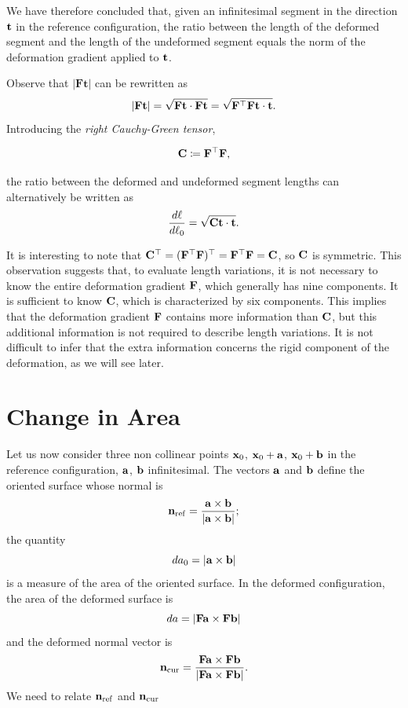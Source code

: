 We have therefore concluded that, given an infinitesimal segment in the direction $\mathbf{t}$ in the reference configuration, the ratio between the length of the deformed segment and the length of the undeformed segment equals the norm of the deformation gradient applied to $\mathbf{t}$.  

Observe that $|\mathbf{Ft}|$ can be rewritten as  
\begin{equation}  
	|\mathbf{Ft}|=\sqrt{\mathbf{F}\mathbf{t}\cdot\mathbf{F}\mathbf{t}}=\sqrt{\mathbf{F}^\top\mathbf{F}\mathbf{t}\cdot\mathbf{t}}.  
\end{equation}  
Introducing the \textit{right Cauchy-Green tensor},  
\begin{definition}  
	\begin{equation}  
		\mathbf{C}\coloneqq\mathbf{F}^\top\mathbf{F},  
	\end{equation}  
\end{definition}  
the ratio between the deformed and undeformed segment lengths can alternatively be written as  
\begin{equation}  
	\frac{d\ell}{d\ell_0}=\sqrt{\mathbf{C}\mathbf{t}\cdot\mathbf{t}}.  
\end{equation}  

\begin{remark}  
	It is interesting to note that $\mathbf{C}^\top=(\mathbf{F}^\top\mathbf{F})^\top=\mathbf{F}^\top\mathbf{F}=\mathbf{C}$, so $\mathbf{C}$ is symmetric. This observation suggests that, to evaluate length variations, it is not necessary to know the entire deformation gradient $\mathbf{F}$, which generally has nine components. It is sufficient to know $\mathbf{C}$, which is characterized by six components. This implies that the deformation gradient $\mathbf{F}$ contains more information than $\mathbf{C}$, but this additional information is not required to describe length variations. It is not difficult to infer that the extra information concerns the rigid component of the deformation, as we will see later.  
\end{remark}  



\section{Change in Area}



Let us now consider  three non collinear points $\mathbf{x}_0$, $\mathbf{x}_0+\mathbf{a}$, $\mathbf{x}_0+\mathbf{b}$ in the reference configuration, $\mathbf{a}$, $\mathbf{b}$ infinitesimal.
The vectors $\mathbf{a}$ and $\mathbf{b}$ define the oriented surface whose normal is
\begin{equation}
	\mathbf{n}_{\rm ref}=\frac{\mathbf{a}\times\mathbf{b}}{|\mathbf{a}\times\mathbf{b}|};
\end{equation}
 the quantity
\begin{equation}
	da_0=|\mathbf{a}\times\mathbf{b}|
\end{equation}
 is a measure of the area of the oriented surface. In the deformed configuration, the area of the deformed surface is
 \begin{equation}
 da=|\mathbf{F} \mathbf{a} \times \mathbf{F} \mathbf{b}|
 \end{equation}
 and the deformed normal vector is 
 \begin{equation}
 \mathbf{n}_{\rm cur}=\frac{\mathbf{F} \mathbf{a} \times \mathbf{F} \mathbf{b}}{|\mathbf{F} \mathbf{a} \times \mathbf{F} \mathbf{b}|}.
 \end{equation}
 We need to relate $ \mathbf{n}_{\rm ref}$ and $ \mathbf{n}_{\rm cur}$
 
